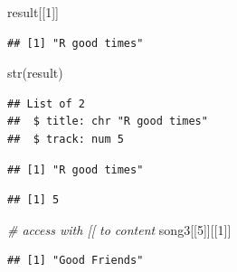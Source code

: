 \documentclass[
]{book}
\newenvironment{Shaded}{\begin{snugshade}}{\end{snugshade}}
\newcommand{\CommentTok}[1]{\textcolor[rgb]{0.56,0.35,0.01}{\textit{#1}}}
\newcommand{\DecValTok}[1]{\textcolor[rgb]{0.00,0.00,0.81}{#1}}
\newcommand{\FunctionTok}[1]{\textcolor[rgb]{0.00,0.00,0.00}{#1}}
\newcommand{\NormalTok}[1]{#1}
\newcommand{\SpecialCharTok}[1]{\textcolor[rgb]{0.00,0.00,0.00}{#1}}
\begin{document}
\begin{Shaded}
\begin{Highlighting}[]
\NormalTok{result[[}\DecValTok{1}\NormalTok{]]}
\end{Highlighting}
\end{Shaded}

\begin{verbatim}
## [1] "R good times"
\end{verbatim}

\begin{Shaded}
\begin{Highlighting}[]
\FunctionTok{str}\NormalTok{(result)}
\end{Highlighting}
\end{Shaded}

\begin{verbatim}
## List of 2
##  $ title: chr "R good times"
##  $ track: num 5
\end{verbatim}

\begin{Shaded}
\end{Shaded}

\begin{verbatim}
## [1] "R good times"
\end{verbatim}

\begin{Shaded}
\end{Shaded}

\begin{verbatim}
## [1] 5
\end{verbatim}

\begin{Shaded}
\begin{Highlighting}[]
\CommentTok{\# access with [[ to content }
\NormalTok{song3[[}\DecValTok{5}\NormalTok{]][[}\DecValTok{1}\NormalTok{]]}
\end{Highlighting}
\end{Shaded}

\begin{verbatim}
## [1] "Good Friends"
\end{verbatim}

\begin{Shaded}
\end{Shaded}
\end{document}
